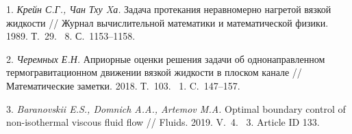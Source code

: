 \litlist

1. {\it Крейн С.Г., Чан Тху Xа.} Задача протекания неравномерно нагретой вязкой жидкости // Журнал вычислительной математики и математической физики. 1989. Т.~29. \No~8. С.~1153--1158.

2. {\it Черемных Е.Н.} Априорные оценки решения задачи об однонаправленном термогравитационном движении вязкой жидкости в плоском канале // Математические заметки. 2018. Т.~103. \No~1. C.~147--157.

3. {\it Baranovskii E.S., Domnich A.A., Artemov M.A.} Optimal boundary control of non-isothermal viscous fluid flow // Fluids. 2019. V.~4. \No~3. Article ID 133.
